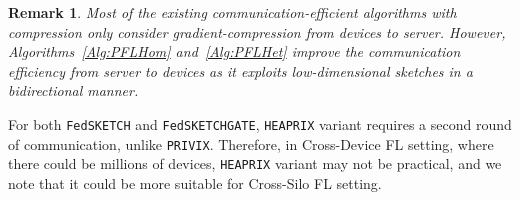 \documentclass[sigconf, anonymous, review]{acmart}
\newcommand\DrawBox[3][]{%
  \begin{tikzpicture}[remember picture,overlay]
    \draw[overlay,fill=gray!30,#1] 
    ([xshift=10em,yshift=-0.4ex]{pic cs:#2}) 
    rectangle 
    ([xshift=-4pt,yshift=1.1ex]pic cs:#3);
  \end{tikzpicture}%
}
\newcommand\DrawBoxx[3][]{%
  \begin{tikzpicture}[remember picture,overlay]
    \draw[overlay,fill=gray!30,#1] 
    ([xshift=-5.0em,yshift=-1.0ex]{pic cs:#2}) 
    rectangle 
    ([xshift=60pt,yshift=-1.2ex]pic cs:#3);
  \end{tikzpicture}%
}
\newtheorem{remark}{Remark}
\begin{document}
\begin{remark}\label{rmk:bidirect}
Most of the existing communication-efficient algorithms with compression only consider gradient-compression from devices to server. 
However, Algorithms~\ref{Alg:PFLHom} and~\ref{Alg:PFLHet} improve the communication efficiency from server to devices as it exploits low-dimensional sketches in a bidirectional manner. 
\end{remark}
For both \texttt{FedSKETCH} and \texttt{FedSKETCHGATE}, \texttt{HEAPRIX} variant requires a second round of communication, unlike \texttt{PRIVIX}. 
Therefore, in Cross-Device FL setting, where there could be millions of devices, \texttt{HEAPRIX} variant may not be practical, and we note that it could be more suitable for Cross-Silo FL setting. 
\end{document}
